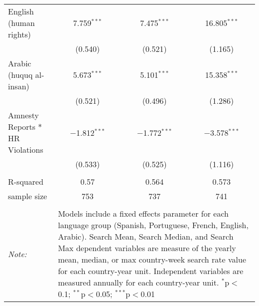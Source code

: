 \begin{table}[!htbp]
\begin{tabular}{@{\extracolsep{5pt}}lccc}
  English (human rights) & 7.759$^{***}$ & 7.475$^{***}$ & 16.805$^{***}$ \\ 
  & (0.540) & (0.521) & (1.165) \\ 
  Arabic (huquq al-insan) & 5.673$^{***}$ & 5.101$^{***}$ & 15.358$^{***}$ \\ 
  & (0.521) & (0.496) & (1.286) \\ 
  Amnesty Reports * HR Violations & $-$1.812$^{***}$ & $-$1.772$^{***}$ & $-$3.578$^{***}$ \\ 
  & (0.533) & (0.525) & (1.116) \\ 
 \hline \\[-1.8ex] 
R-squared  & 0.57 & 0.564 & 0.573 \\ 
sample size  & 753 & 737 & 741 \\ 
\hline 
\hline \\[-1.8ex] 
\textit{Note:}  & \multicolumn{3}{l}{\parbox[t]{8cm}{Models include a fixed effects parameter for each language group (Spanish, Portuguese, French, English, Arabic). Search Mean, Search Median, and Search Max dependent variables are measure of the yearly mean, median, or max country-week search rate value for each country-year unit. Independent variables are measured annually for each country-year unit. $^{*}$p$<$0.1; $^{**}$p$<$0.05; $^{***}$p$<$0.01}} \\ 
\end{tabular} 
\end{table} 
